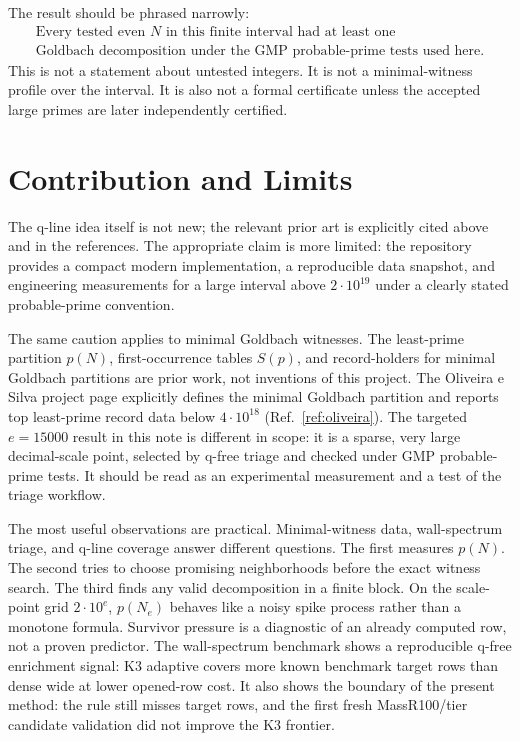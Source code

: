 \documentclass[11pt]{article}
\begin{document}
The result should be phrased narrowly:
\[
\begin{gathered}
\text{Every tested even }N\text{ in this finite interval had at least one}\\
\text{Goldbach decomposition under the GMP probable-prime tests used here.}
\end{gathered}
\]
This is not a statement about untested integers. It is not a minimal-witness
profile over the interval. It is also not a formal certificate unless the
accepted large primes are later independently certified.

\section{Contribution and Limits}

The q-line idea itself is not new; the relevant prior art is explicitly cited
above and in the references. The appropriate claim is more limited: the
repository provides a compact modern implementation, a reproducible data
snapshot, and engineering measurements for a large interval above \(2\cdot
10^{19}\) under a clearly stated probable-prime convention.

The same caution applies to minimal Goldbach witnesses. The least-prime
partition \(p(N)\), first-occurrence tables \(S(p)\), and record-holders for
minimal Goldbach partitions are prior work, not inventions of this project.
The Oliveira e Silva project page explicitly defines the minimal Goldbach
partition and reports top least-prime record data below \(4\cdot10^{18}\)
(Ref.~\ref{ref:oliveira}). The targeted \(e=15000\) result in this note is
different in scope: it is a sparse, very large decimal-scale point, selected
by q-free triage and checked under GMP probable-prime tests. It should be read
as an experimental measurement and a test of the triage workflow.

The most useful observations are practical. Minimal-witness data,
wall-spectrum triage, and q-line coverage answer different questions. The
first measures \(p(N)\). The second tries to choose promising neighborhoods
before the exact witness search. The third finds any valid decomposition in a
finite block. On the scale-point grid \(2\cdot10^e\), \(p(N_e)\) behaves like a
noisy spike process rather than a monotone formula. Survivor pressure is a
diagnostic of an already computed row, not a proven predictor. The
wall-spectrum benchmark shows a reproducible q-free enrichment signal: K3
adaptive covers more known benchmark target rows than dense wide at lower
opened-row cost. It also shows the boundary of the present method: the rule
still misses target rows, and the first fresh MassR100/tier candidate validation did not
improve the K3 frontier.
\end{document}
